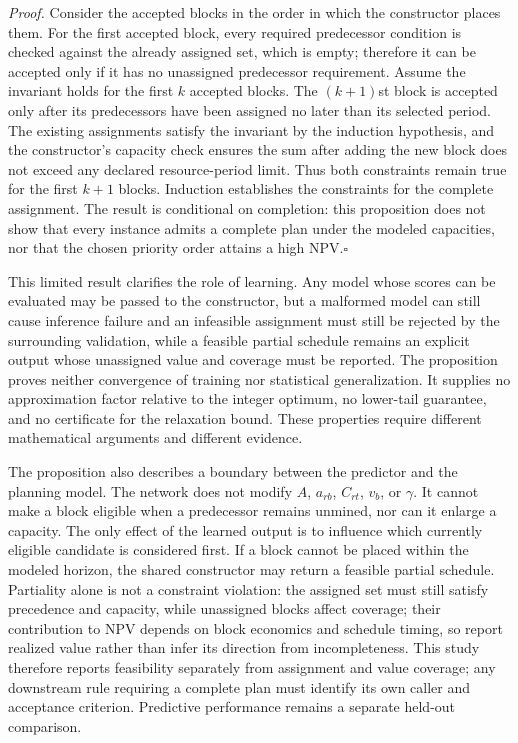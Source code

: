 \documentclass[11pt]{article}
\begin{document}
\textit{Proof.} Consider the accepted blocks in the order in which the constructor places them. For the first accepted block, every required predecessor condition is checked against the already assigned set, which is empty; therefore it can be accepted only if it has no unassigned predecessor requirement. Assume the invariant holds for the first $k$ accepted blocks. The $(k+1)$st block is accepted only after its predecessors have been assigned no later than its selected period. The existing assignments satisfy the invariant by the induction hypothesis, and the constructor's capacity check ensures the sum after adding the new block does not exceed any declared resource-period limit. Thus both constraints remain true for the first $k+1$ blocks. Induction establishes the constraints for the complete assignment. The result is conditional on completion: this proposition does not show that every instance admits a complete plan under the modeled capacities, nor that the chosen priority order attains a high NPV.\hfill$\square$

This limited result clarifies the role of learning. Any model whose scores can be evaluated may be passed to the constructor, but a malformed model can still cause inference failure and an infeasible assignment must still be rejected by the surrounding validation, while a feasible partial schedule remains an explicit output whose unassigned value and coverage must be reported. The proposition proves neither convergence of training nor statistical generalization. It supplies no approximation factor relative to the integer optimum, no lower-tail guarantee, and no certificate for the relaxation bound. These properties require different mathematical arguments and different evidence.

The proposition also describes a boundary between the predictor and the planning model. The network does not modify $A$, $a_{rb}$, $C_{rt}$, $v_b$, or $\gamma$. It cannot make a block eligible when a predecessor remains unmined, nor can it enlarge a capacity. The only effect of the learned output is to influence which currently eligible candidate is considered first. If a block cannot be placed within the modeled horizon, the shared constructor may return a feasible partial schedule. Partiality alone is not a constraint violation: the assigned set must still satisfy precedence and capacity, while unassigned blocks affect coverage; their contribution to NPV depends on block economics and schedule timing, so report realized value rather than infer its direction from incompleteness. This study therefore reports feasibility separately from assignment and value coverage; any downstream rule requiring a complete plan must identify its own caller and acceptance criterion. Predictive performance remains a separate held-out comparison.
\end{document}
